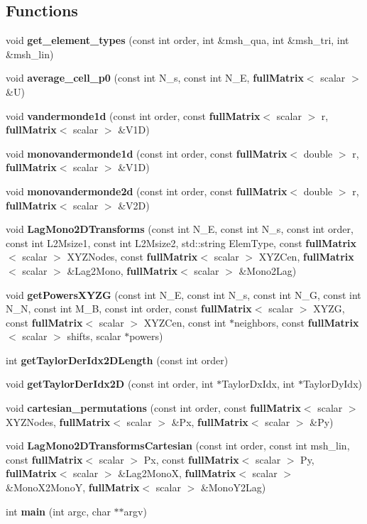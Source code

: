 \subsection*{Functions}
\begin{DoxyCompactItemize}
\item 
void {\bfseries get\-\_\-element\-\_\-types} (const int order, int \&msh\-\_\-qua, int \&msh\-\_\-tri, int \&msh\-\_\-lin)\label{main_8cc_a2918ac60d0f8df2781b31712bf75885f}

\item 
void {\bfseries average\-\_\-cell\-\_\-p0} (const int N\-\_\-s, const int N\-\_\-\-E, {\bf full\-Matrix}$<$ scalar $>$ \&U)\label{main_8cc_a49cfa74e202b2a15c1a8265f1960877b}

\item 
void {\bf vandermonde1d} (const int order, const {\bf full\-Matrix}$<$ scalar $>$ r, {\bf full\-Matrix}$<$ scalar $>$ \&V1\-D)
\item 
void {\bf monovandermonde1d} (const int order, const {\bf full\-Matrix}$<$ double $>$ r, {\bf full\-Matrix}$<$ scalar $>$ \&V1\-D)
\item 
void {\bf monovandermonde2d} (const int order, const {\bf full\-Matrix}$<$ double $>$ r, {\bf full\-Matrix}$<$ scalar $>$ \&V2\-D)
\item 
void {\bf Lag\-Mono2\-D\-Transforms} (const int N\-\_\-\-E, const int N\-\_\-s, const int order, const int L2\-Msize1, const int L2\-Msize2, std\-::string Elem\-Type, const {\bf full\-Matrix}$<$ scalar $>$ X\-Y\-Z\-Nodes, const {\bf full\-Matrix}$<$ scalar $>$ X\-Y\-Z\-Cen, {\bf full\-Matrix}$<$ scalar $>$ \&Lag2\-Mono, {\bf full\-Matrix}$<$ scalar $>$ \&Mono2\-Lag)
\item 
void {\bf get\-Powers\-X\-Y\-Z\-G} (const int N\-\_\-\-E, const int N\-\_\-s, const int N\-\_\-\-G, const int N\-\_\-\-N, const int M\-\_\-\-B, const int order, const {\bf full\-Matrix}$<$ scalar $>$ X\-Y\-Z\-G, const {\bf full\-Matrix}$<$ scalar $>$ X\-Y\-Z\-Cen, const int $\ast$neighbors, const {\bf full\-Matrix}$<$ scalar $>$ shifts, scalar $\ast$powers)
\item 
int {\bf get\-Taylor\-Der\-Idx2\-D\-Length} (const int order)
\item 
void {\bf get\-Taylor\-Der\-Idx2\-D} (const int order, int $\ast$Taylor\-Dx\-Idx, int $\ast$Taylor\-Dy\-Idx)
\item 
void {\bf cartesian\-\_\-permutations} (const int order, const {\bf full\-Matrix}$<$ scalar $>$ X\-Y\-Z\-Nodes, {\bf full\-Matrix}$<$ scalar $>$ \&Px, {\bf full\-Matrix}$<$ scalar $>$ \&Py)
\item 
void {\bf Lag\-Mono2\-D\-Transforms\-Cartesian} (const int order, const int msh\-\_\-lin, const {\bf full\-Matrix}$<$ scalar $>$ Px, const {\bf full\-Matrix}$<$ scalar $>$ Py, {\bf full\-Matrix}$<$ scalar $>$ \&Lag2\-Mono\-X, {\bf full\-Matrix}$<$ scalar $>$ \&Mono\-X2\-Mono\-Y, {\bf full\-Matrix}$<$ scalar $>$ \&Mono\-Y2\-Lag)
\item 
int {\bf main} (int argc, char $\ast$$\ast$argv)
\end{DoxyCompactItemize}


